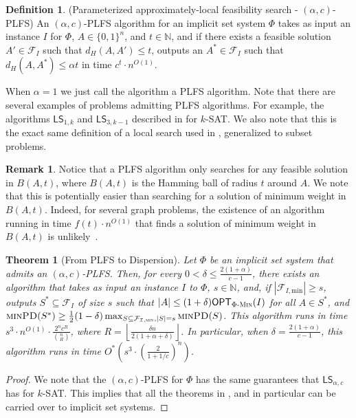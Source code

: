 \documentclass[11pt, letterpaper]{article}
\newtheorem{theorem}{Theorem}
\theoremstyle{definition}
\newtheorem{definition}{Definition}
\newtheorem{remark}{Remark}
\newcommand{\Q}[1]{\{0,1\}^{#1}}
\newcommand{\calf}{\mathcal{F}}
\newcommand{\LS}{\textsf{LS}}
\newcommand{\phimin}{\Phi\textsc{-Min}}
\newcommand{\OPT}{\textsf{OPT}}
\newcommand{\PD}{\textsc{minPD}}
\newcommand{\IN}{\ensuremath{\mathbb{N}}}
\newcommand{\floor}[1]{{\left\lfloor{#1}\right\rfloor}}
\begin{document}
\begin{definition}(Parameterized approximately-local feasibility search - $(\alpha,c)$-PLFS) An $(\alpha,c)$-PLFS algorithm for an implicit set system $\Phi$ takes as input an instance $I$ for $\Phi$, $A \in \Q{n}$, and $t \in \IN$, and if there exists a feasible solution $A' \in \mathcal{F}_I$ such that $d_H(A,A') \leq t$, outputs an $A^* \in \mathcal{F}_I$ such that $d_H(A, A^*) \leq \alpha t$ in time $c^t \cdot n^{O(1)}$. 
\end{definition}
When $\alpha=1$ we just call the algorithm a PLFS algorithm. Note that there are several examples of problems admitting PLFS algorithms. For example, the algorithms $\LS_{1,k}$ and $\LS_{3, k-1}$ described in  for $k$-SAT. We also note that this is the exact same definition of a local search used in , generalized to subset problems. 

\begin{remark}
    Notice that a PLFS algorithm only searches for any feasible solution in $B(A,t)$, where $B(A,t)$ is the Hamming ball of radius $t$ around $A$. We note that this is potentially easier than searching for a solution of minimum weight in $B(A,t)$. Indeed, for several graph problems, the existence of an algorithm running in time $f(t) \cdot n^{O(1)}$ that finds a solution of minimum weight in $B(A,t)$ is unlikely~\cite{fellows2012local}.
\end{remark}
 
\begin{theorem}[From PLFS to Dispersion] \label{thm:PLFS}
    Let $\Phi$ be an implicit set system that admits an $(\alpha,c)$-PLFS. 
    Then, for every $0 < \delta \leq \frac{2(1+\alpha)}{c-1}$, there exists an algorithm that takes as input an instance $I$ to $\Phi$, $s \in \IN$, and, if $|\calf_{I, \text{min}}| \geq s$, outputs $S^* \subseteq \mathcal{F}_I$ of size $s$ such that $|A| \leq (1+\delta) \OPT_{\phimin}(I)$ for all $A \in S^*$, and $\PD(S^*) \geq \frac{1}{2}(1-\delta) \max_{S \subseteq \mathcal{F_{I, \textsc{min}}}, |S|=s} \PD(S)$. This algorithm runs in time $s^3 \cdot n^{O(1)} \cdot \frac{2^n c^{R}}{\binom{n}{R} }$, where $R=\floor{\frac{\delta n}{2(1+\alpha+\delta)}}$.
    In particular, when $\delta = \frac{2(1+\alpha)}{c-1}$, this algorithm runs in time $O^*\left( s^3 \cdot \left( \frac{2}{1+1/c} \right)^n \right)$.
\end{theorem}
\begin{proof} 
    We note that the $(\alpha,c)$-PLFS for $\Phi$ has the same guarantees that $\LS_{\alpha,c}$ has for $k$-SAT. This implies that all the theorems in , and in particular  can be carried over to implicit set systems.
\end{proof}
\end{document}
